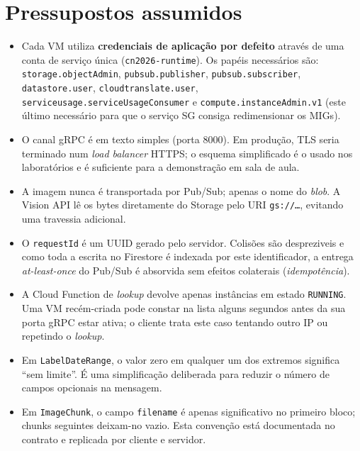 \documentclass[11pt,a4paper]{article}
\begin{document}
\section{Pressupostos assumidos}
\label{sec:pressupostos}

\begin{itemize}[leftmargin=1.4em,itemsep=2pt]
  \item Cada VM utiliza \textbf{credenciais de aplica\c{c}\~ao por defeito}
        atrav\'es de uma conta de servi\c{c}o \'unica
        (\texttt{cn2026-runtime}). Os pap\'eis necess\'arios s\~ao:
        \texttt{storage.objectAdmin}, \texttt{pubsub.publisher},
        \texttt{pubsub.subscriber}, \texttt{datastore.user},
        \texttt{cloudtranslate.user},
        \texttt{serviceusage.serviceUsageConsumer} e
        \texttt{compute.instanceAdmin.v1} (este \'ultimo necess\'ario para
        que o servi\c{c}o SG consiga redimensionar os MIGs).
  \item O canal gRPC \'e em texto simples (porta 8000). Em produ\c{c}\~ao,
        TLS seria terminado num \emph{load balancer} HTTPS; o esquema
        simplificado \'e o usado nos laborat\'orios e \'e suficiente para a
        demonstra\c{c}\~ao em sala de aula.
  \item A imagem nunca \'e transportada por Pub/Sub; apenas o nome do
        \emph{blob}. A Vision API l\^e os bytes diretamente do Storage
        pelo URI \texttt{gs://\dots}, evitando uma travessia adicional.
  \item O \texttt{requestId} \'e um UUID gerado pelo servidor.
        Colis\~oes s\~ao despreziveis e como toda a escrita no Firestore \'e
        indexada por este identificador, a entrega \emph{at-least-once}
        do Pub/Sub \'e absorvida sem efeitos colaterais
        (\emph{idempot\^encia}).
  \item A Cloud Function de \emph{lookup} devolve apenas inst\^ancias em
        estado \texttt{RUNNING}. Uma VM rec\'em-criada pode constar na
        lista alguns segundos antes da sua porta gRPC estar ativa; o
        cliente trata este caso tentando outro IP ou repetindo o
        \emph{lookup}.
  \item Em \texttt{LabelDateRange}, o valor zero em qualquer um dos
        extremos significa ``sem limite''. \'E uma simplifica\c{c}\~ao
        deliberada para reduzir o n\'umero de campos opcionais na
        mensagem.
  \item Em \texttt{ImageChunk}, o campo \texttt{filename} \'e apenas
        significativo no primeiro bloco; chunks seguintes deixam-no
        vazio. Esta conven\c{c}\~ao est\'a documentada no contrato e
        replicada por cliente e servidor.
\end{itemize}
\end{document}
